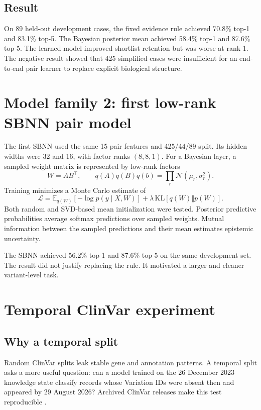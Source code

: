 \documentclass[11pt]{article}
\begin{document}
\subsection{Result}

On 89 held-out development cases, the fixed evidence rule achieved 70.8\% top-1 and 83.1\% top-5. The Bayesian posterior mean achieved 58.4\% top-1 and 87.6\% top-5. The learned model improved shortlist retention but was worse at rank 1. The negative result showed that 425 simplified cases were insufficient for an end-to-end pair learner to replace explicit biological structure.

\section{Model family 2: first low-rank SBNN pair model}

The first SBNN \citep{toure2026} used the same 15 pair features and 425/44/89 split. Its hidden widths were 32 and 16, with factor ranks $(8,8,1)$. For a Bayesian layer, a sampled weight matrix is represented by low-rank factors
\begin{equation}
W=AB^\top,\qquad q(A)q(B)q(b)=\prod_r\mathcal{N}(\mu_r,\sigma_r^2).
\end{equation}
Training minimizes a Monte Carlo estimate of
\begin{equation}
\mathcal{L}=\mathbb{E}_{q(W)}[-\log p(y\mid X,W)]+\lambda\,\mathrm{KL}[q(W)\Vert p(W)].
\end{equation}
Both random and SVD-based mean initialization were tested. Posterior predictive probabilities average softmax predictions over sampled weights. Mutual information between the sampled predictions and their mean estimates epistemic uncertainty.

The SBNN achieved 56.2\% top-1 and 87.6\% top-5 on the same development set. The result did not justify replacing the rule. It motivated a larger and cleaner variant-level task.

\section{Temporal ClinVar experiment}

\subsection{Why a temporal split}

Random ClinVar splits leak stable gene and annotation patterns. A temporal split asks a more useful question: can a model trained on the 26 December 2023 knowledge state classify records whose Variation IDs were absent then and appeared by 29 August 2026? Archived ClinVar releases make this test reproducible \citep{clinvar}.
\end{document}
